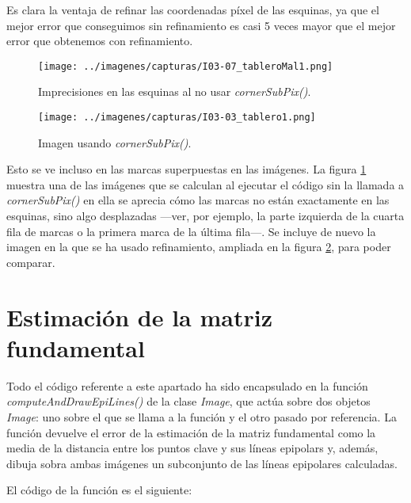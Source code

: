 \documentclass[a4paper, 11pt]{article}
\theoremstyle{definition}
\theoremstyle{theorem}
\begin{document}
    Es clara la ventaja de refinar las coordenadas píxel de las esquinas, ya que el mejor error que conseguimos sin refinamiento es casi 5 veces mayor que el mejor error que obtenemos con refinamiento.

    \begin{figure}[htb!]
        \centering
        \texttt{[image: ../imagenes/capturas/I03-07\_tableroMal1.png]}
        \caption{Imprecisiones en las esquinas al no usar \emph{cornerSubPix()}. \label{sinSubPix}}
    \end{figure}
    \begin{figure}[htb!]
        \centering
        \texttt{[image: ../imagenes/capturas/I03-03\_tablero1.png]}
        \caption{Imagen usando \emph{cornerSubPix()}. \label{conSubPix}}
    \end{figure}

    Esto se ve incluso en las marcas superpuestas en las imágenes. La figura \ref{sinSubPix} muestra una de las imágenes que se calculan al ejecutar el código sin la llamada a \emph{cornerSubPix()} en ella se aprecia cómo las marcas no están exactamente en las esquinas, sino algo desplazadas ---ver, por ejemplo, la parte izquierda de la cuarta fila de marcas o la primera marca de la última fila---. Se incluye de nuevo la imagen en la que se ha usado refinamiento, ampliada en la figura \ref{conSubPix}, para poder comparar.


    \section{Estimación de la matriz fundamental}
    Todo el código referente a este apartado ha sido encapsulado en la función \emph{computeAndDrawEpiLines()} de la clase \emph{Image}, que actúa sobre dos objetos \emph{Image}: uno sobre el que se llama a la función y el otro pasado por referencia. La función devuelve el error de la estimación de la matriz fundamental como la media de la distancia entre los puntos clave y sus líneas epipolars y, además, dibuja sobra ambas imágenes un subconjunto de las líneas epipolares calculadas.

    El código de la función es el siguiente:
\end{document}
